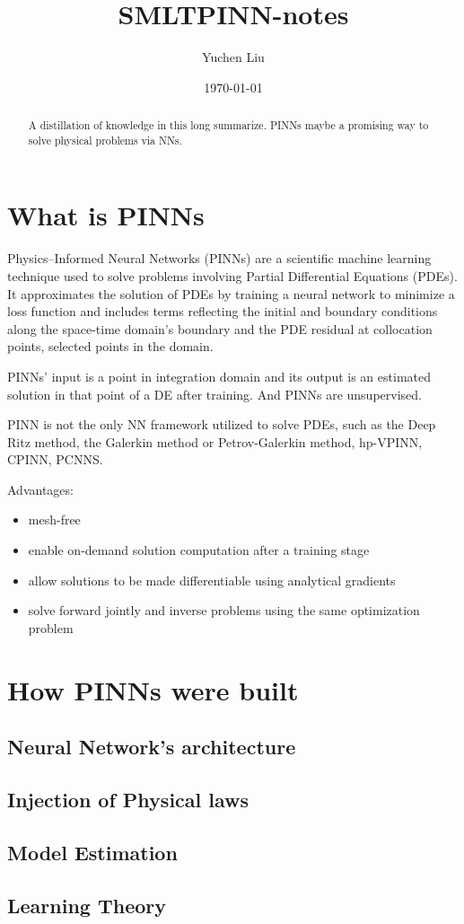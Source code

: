 \documentclass{article}
\title{SMLTPINN-notes}
\author{Yuchen Liu}
\date{\today}
\begin{document}
\maketitle
\tableofcontents

\begin{abstract}
    A distillation of knowledge in this long summarize. PINNs maybe a promising way to solve physical problems via NNs.
\end{abstract}
\section{What is PINNs}
\par Physics–Informed Neural Networks (PINNs) are a scientific machine learning technique used to solve problems involving Partial Differential Equations (PDEs). It approximates the solution of PDEs by training a neural network to minimize a loss function and includes terms reflecting the initial and boundary conditions along the space-time domain's boundary and the PDE residual at collocation points, selected points in the domain.
\par PINNs' input is a point in integration domain and its output is an estimated solution in that point of a DE after training. And PINNs are unsupervised.
\par PINN is not the only NN framework utilized to solve PDEs, such as the Deep Ritz method, the Galerkin method or Petrov-Galerkin method, hp-VPINN, CPINN, PCNNS.
\par Advantages:
\begin{itemize}
    \item mesh-free
    \item enable on-demand solution computation after a training stage
    \item allow solutions to be made differentiable using analytical gradients
    \item solve forward jointly and inverse problems using the same optimization problem
\end{itemize}
\section{How PINNs were built}

\subsection{Neural Network's architecture}
\subsection{Injection of Physical laws}
\subsection{Model Estimation}
\subsection{Learning Theory}
\end{document}
